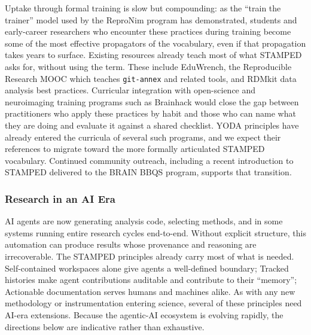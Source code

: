 \documentclass{article}
\makeatletter
\newcommand{\hyanchor}[1]{\texorpdfstring{\Hy@raisedlink{\hypertarget{#1}{}}}{}}
\newcommand{\anchoredsubsubsection}[2]{\subsubsection[#2]{\hyanchor{#1}#2}}
\makeatother
\begin{document}
Uptake through formal training is slow but compounding: as the ``train the trainer'' model used by the ReproNim program has demonstrated, students and early-career researchers who encounter these practices during training become some of the most effective propagators of the vocabulary, even if that propagation takes years to surface.
Existing resources already teach most of what STAMPED asks for, without using the term.
These include EduWrench\cite{casanova_eduwrench_2023}, the Reproducible Research MOOC which teaches \texttt{git-annex} and related tools\cite{legrand_reproducible_2022}, and RDMkit data analysis best practices\cite{elixir_rdmkit_community_data_2024}.
Curricular integration with open-science and neuroimaging training programs such as Brainhack would close the gap between practitioners who apply these practices by habit and those who can name what they are doing and evaluate it against a shared checklist.
YODA principles have already entered the curricula of several such programs, and we expect their references to migrate toward the more formally articulated STAMPED vocabulary.
Continued community outreach, including a recent introduction to STAMPED\cite{baker_guidelines_2026} delivered to the BRAIN BBQS program, supports that transition.


\anchoredsubsubsection{ai-era}{Research in an AI Era}

AI agents are now generating analysis code, selecting methods, and in some systems running entire research cycles end-to-end\cite{boiko_autonomous_2023, lu_ai_2024, mitchener_kosmos_2025}.
Without explicit structure, this automation can produce results whose provenance and reasoning are irrecoverable\cite{messeri_artificial_2024}.
The STAMPED principles already carry most of what is needed.
Self-contained workspaces alone give agents a well-defined boundary; Tracked histories make agent contributions auditable and contribute to their ``memory''; Actionable documentation serves humans and machines alike.
As with any new methodology or instrumentation entering science, several of these principles need AI-era extensions.
Because the agentic-AI ecosystem is evolving rapidly, the directions below are indicative rather than exhaustive.
\end{document}
